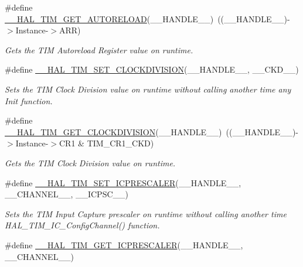 \begin{DoxyCompactItemize}
\#define \hyperlink{group___t_i_m___exported___macros_gaa7a5c7645695bad15bacd402513a028a}{\+\_\+\+\_\+\+H\+A\+L\+\_\+\+T\+I\+M\+\_\+\+G\+E\+T\+\_\+\+A\+U\+T\+O\+R\+E\+L\+O\+AD}(\+\_\+\+\_\+\+H\+A\+N\+D\+L\+E\+\_\+\+\_\+)~((\+\_\+\+\_\+\+H\+A\+N\+D\+L\+E\+\_\+\+\_\+)-\/$>$Instance-\/$>$A\+RR)
\begin{DoxyCompactList}\small\item\em Gets the T\+IM Autoreload Register value on runtime. \end{DoxyCompactList}\item 
\#define \hyperlink{group___t_i_m___exported___macros_ga8aa84d77c670890408092630f9b2bdc4}{\+\_\+\+\_\+\+H\+A\+L\+\_\+\+T\+I\+M\+\_\+\+S\+E\+T\+\_\+\+C\+L\+O\+C\+K\+D\+I\+V\+I\+S\+I\+ON}(\+\_\+\+\_\+\+H\+A\+N\+D\+L\+E\+\_\+\+\_\+,  \+\_\+\+\_\+\+C\+K\+D\+\_\+\+\_\+)
\begin{DoxyCompactList}\small\item\em Sets the T\+IM Clock Division value on runtime without calling another time any Init function. \end{DoxyCompactList}\item 
\#define \hyperlink{group___t_i_m___exported___macros_gae6bc91bb5940bce52828c690f24001b8}{\+\_\+\+\_\+\+H\+A\+L\+\_\+\+T\+I\+M\+\_\+\+G\+E\+T\+\_\+\+C\+L\+O\+C\+K\+D\+I\+V\+I\+S\+I\+ON}(\+\_\+\+\_\+\+H\+A\+N\+D\+L\+E\+\_\+\+\_\+)~((\+\_\+\+\_\+\+H\+A\+N\+D\+L\+E\+\_\+\+\_\+)-\/$>$Instance-\/$>$C\+R1 \& T\+I\+M\+\_\+\+C\+R1\+\_\+\+C\+KD)
\begin{DoxyCompactList}\small\item\em Gets the T\+IM Clock Division value on runtime. \end{DoxyCompactList}\item 
\#define \hyperlink{group___t_i_m___exported___macros_gaeb106399b95ef02cec502f58276a0e92}{\+\_\+\+\_\+\+H\+A\+L\+\_\+\+T\+I\+M\+\_\+\+S\+E\+T\+\_\+\+I\+C\+P\+R\+E\+S\+C\+A\+L\+ER}(\+\_\+\+\_\+\+H\+A\+N\+D\+L\+E\+\_\+\+\_\+,  \+\_\+\+\_\+\+C\+H\+A\+N\+N\+E\+L\+\_\+\+\_\+,  \+\_\+\+\_\+\+I\+C\+P\+S\+C\+\_\+\+\_\+)
\begin{DoxyCompactList}\small\item\em Sets the T\+IM Input Capture prescaler on runtime without calling another time H\+A\+L\+\_\+\+T\+I\+M\+\_\+\+I\+C\+\_\+\+Config\+Channel() function. \end{DoxyCompactList}\item 
\#define \hyperlink{group___t_i_m___exported___macros_gabfeec6b3c67a5747c7dbd20aff61d8e2}{\+\_\+\+\_\+\+H\+A\+L\+\_\+\+T\+I\+M\+\_\+\+G\+E\+T\+\_\+\+I\+C\+P\+R\+E\+S\+C\+A\+L\+ER}(\+\_\+\+\_\+\+H\+A\+N\+D\+L\+E\+\_\+\+\_\+,  \+\_\+\+\_\+\+C\+H\+A\+N\+N\+E\+L\+\_\+\+\_\+)

\end{DoxyCompactItemize}

